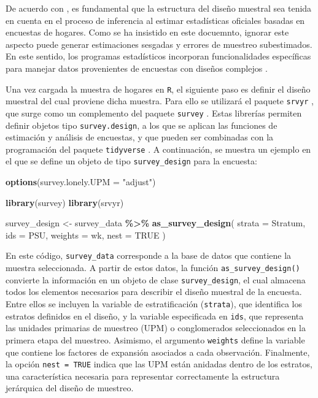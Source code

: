 \documentclass[
  spanish,
  12pt,
]{book}
\newenvironment{Shaded}{\begin{snugshade}}{\end{snugshade}}
\newcommand{\AttributeTok}[1]{\textcolor[rgb]{0.13,0.29,0.53}{#1}}
\newcommand{\ConstantTok}[1]{\textcolor[rgb]{0.56,0.35,0.01}{#1}}
\newcommand{\FunctionTok}[1]{\textcolor[rgb]{0.13,0.29,0.53}{\textbf{#1}}}
\newcommand{\NormalTok}[1]{#1}
\newcommand{\OtherTok}[1]{\textcolor[rgb]{0.56,0.35,0.01}{#1}}
\newcommand{\SpecialCharTok}[1]{\textcolor[rgb]{0.81,0.36,0.00}{\textbf{#1}}}
\newcommand{\StringTok}[1]{\textcolor[rgb]{0.31,0.60,0.02}{#1}}
\begin{document}
De acuerdo con \citet[sección 7.8]{ONUDeff}, es fundamental que la estructura del diseño muestral sea tenida en cuenta en el proceso de inferencia al estimar estadísticas oficiales basadas en encuestas de hogares. Como se ha insistido en este docuemnto, ignorar este aspecto puede generar estimaciones sesgadas y errores de muestreo subestimados. En este sentido, los programas estadísticos incorporan funcionalidades específicas para manejar datos provenientes de encuestas con diseños complejos \citep[apéndice A]{heeringa2017applied}.

Una vez cargada la muestra de hogares en \texttt{R}, el siguiente paso es definir el diseño muestral del cual proviene dicha muestra. Para ello se utilizará el paquete \texttt{srvyr} \citep{Freedman2024}, que surge como un complemento del paquete \texttt{survey} \citep{Lumley2024}. Estas librerías permiten definir objetos tipo \texttt{survey.design}, a los que se aplican las funciones de estimación y análisis de encuestas, y que pueden ser combinadas con la programación del paquete \texttt{tidyverse} \citep{tidyverse2026}. A continuación, se muestra un ejemplo en el que se define un objeto de tipo \texttt{survey\_design} para la encuesta:

\begin{Shaded}
\begin{Highlighting}[]
\FunctionTok{options}\NormalTok{(}\AttributeTok{survey.lonely.UPM =} \StringTok{"adjust"}\NormalTok{)}

\FunctionTok{library}\NormalTok{(survey)}
\FunctionTok{library}\NormalTok{(srvyr)}

\NormalTok{survey\_design }\OtherTok{\textless{}{-}}\NormalTok{ survey\_data }\SpecialCharTok{\%\textgreater{}\%}
  \FunctionTok{as\_survey\_design}\NormalTok{(}
    \AttributeTok{strata =}\NormalTok{ Stratum,}
    \AttributeTok{ids =}\NormalTok{ PSU,}
    \AttributeTok{weights =}\NormalTok{ wk,}
    \AttributeTok{nest =} \ConstantTok{TRUE}
\NormalTok{  )}
\end{Highlighting}
\end{Shaded}

En este código, \texttt{survey\_data} corresponde a la base de datos que contiene la muestra seleccionada. A partir de estos datos, la función \texttt{as\_survey\_design()} convierte la información en un objeto de clase \texttt{survey\_design}, el cual almacena todos los elementos necesarios para describir el diseño muestral de la encuesta. Entre ellos se incluyen la variable de estratificación (\texttt{strata}), que identifica los estratos definidos en el diseño, y la variable especificada en \texttt{ids}, que representa las unidades primarias de muestreo (UPM) o conglomerados seleccionados en la primera etapa del muestreo. Asimismo, el argumento \texttt{weights} define la variable que contiene los factores de expansión asociados a cada observación. Finalmente, la opción \texttt{nest\ =\ TRUE} indica que las UPM están anidadas dentro de los estratos, una característica necesaria para representar correctamente la estructura jerárquica del diseño de muestreo.
\end{document}
